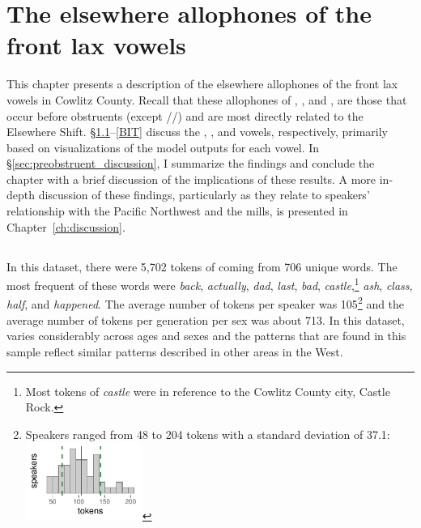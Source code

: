 \chapter{The elsewhere allophones of the front lax vowels}
\label{ch:elsewhere_shift}

This chapter presents a description of the elsewhere allophones of the front lax vowels in Cowlitz County. Recall that these allophones of \trap, \dress, and \kit, are those that occur before obstruents (except //) and are most directly related to the Elsewhere Shift. \S\ref{BAT}--\ref{BIT} discuss the \bat, \bet, and \bit vowels, respectively, primarily based on visualizations of the model outputs for each vowel. In \S\ref{sec:preobstruent_discussion}, I summarize the findings and conclude the chapter with a brief discussion of the implications of these results. A more in-depth discussion of these findings, particularly as they relate to speakers' relationship with the Pacific Northwest and the mills, is presented in Chapter~\ref{ch:discussion}.


\section{\bat}
\label{BAT}

In this dataset, there were 5,702 tokens of \bat coming from 706 unique words. The most frequent of these words were \textit{back}, \textit{actually}, \textit{dad}, \textit{last}, \textit{bad}, \textit{castle},\footnote{Most tokens of \textit{castle} were in reference to the Cowlitz County city, Castle Rock.} \textit{ash}, \textit{class}, \textit{half}, and \textit{happened}. The average number of tokens per speaker was 105\footnote{Speakers ranged from 48 to 204 tokens with a standard deviation of 37.1: \includegraphics[width = 1.5in]{Figures/BAT/BAT_tiny.pdf}} and the average number of tokens per generation per sex was about 713. In this dataset, \bat varies considerably across ages and sexes and the patterns that are found in this sample reflect similar patterns described in other areas in the West.

